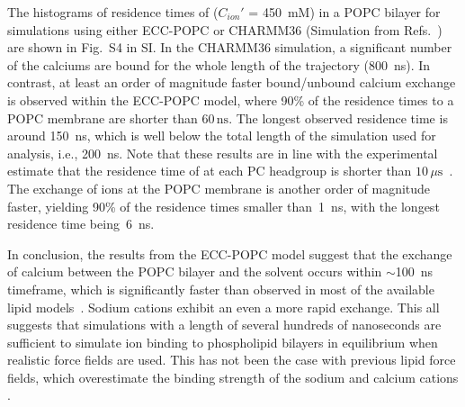 \documentclass[aip,jcp,twocolumn]{revtex4}
\begin{document}
The histograms of residence times of  ($C_{ion}'$ = 450~mM) in a POPC bilayer for simulations using either ECC-POPC or CHARMM36 (Simulation from Refs.~) are shown in Fig.~S4 in SI. In the CHARMM36 simulation, a significant number of the calciums are bound for the whole length of the trajectory (800~ns). In contrast, at least an order of magnitude faster bound/unbound calcium exchange is observed within the ECC-POPC model, where 90\% of the  residence times to a POPC membrane are shorter than $60\,\mathrm{ns}$. The longest observed residence time is around 150~ns, which is well below the total length of the simulation used for analysis, i.e., 200~ns. Note that these results are in line with the experimental estimate that the residence time of  at each PC headgroup is shorter than $10\,\mu\mathrm{s}$~\cite{altenbach84}. The exchange of  ions at the POPC membrane is another order of magnitude faster, yielding 90\% of the residence times smaller than~1~ns, with the longest residence time being~6~ns.


In conclusion, the results from the ECC-POPC model suggest that the exchange of calcium between the POPC bilayer and the solvent occurs within $\sim$100~ns timeframe, which is significantly faster than observed in most of the available lipid models~\cite{javanainen17}. Sodium cations exhibit an even a more rapid exchange. This all suggests that simulations with a length of several hundreds of nanoseconds are sufficient to simulate ion binding to phospholipid bilayers in equilibrium when realistic force fields are used. This has not been the case with previous lipid force fields, which overestimate the binding strength of the sodium and calcium cations \cite{javanainen17, catte16}.
\end{document}
